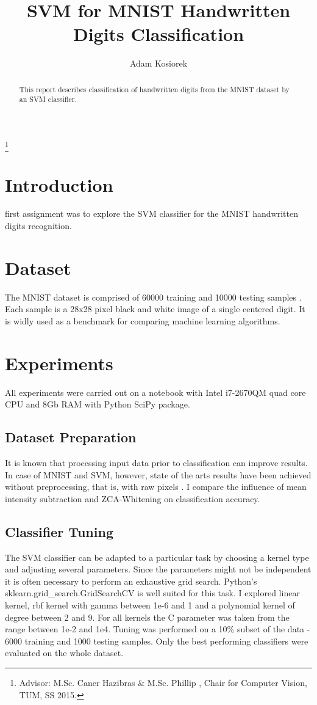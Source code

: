\documentclass[journal, a4paper]{IEEEtran}
\begin{document}
	\title{SVM for MNIST Handwritten Digits Classification}
	\author{Adam Kosiorek}
	\thanks{Advisor: M.Sc. Caner Hazibras & M.Sc. Phillip , Chair for Computer Vision, TUM, SS 2015.}
	\maketitle


\begin{abstract}
  This report describes classification of handwritten digits from the MNIST dataset by an SVM classifier.
\end{abstract}

\section{Introduction}
     first assignment was to explore the SVM classifier for the MNIST handwritten digits recognition. 

\section{Dataset}
    The MNIST dataset is comprised of 60000 training and 10000 testing samples \cite{MNIST}. Each sample is a 28x28 pixel black and white image of a single centered digit. It is widly used as a benchmark for comparing machine learning algorithms.
	

\section{Experiments}
    All experiments were carried out on a notebook with Intel i7-2670QM quad core CPU and 8Gb RAM with Python SciPy package.
    \subsection{Dataset Preparation}
	It is known that processing input data prior to classification can improve results. In case of MNIST and SVM, however, state of the arts results have been achieved without preprocessing, that is, with raw pixels \cite{VSVM}. I compare the influence of mean intensity subtraction and ZCA-Whitening \cite{UFLDL} on classification accuracy.
  
    \subsection{Classifier Tuning}
	The SVM classifier can be adapted to a particular task by choosing a kernel type and adjusting several parameters. Since the parameters might not be independent it is often necessary to perform an exhaustive grid search. Python's sklearn.grid\_search.GridSearchCV is well suited for this task. I explored linear kernel, rbf kernel with gamma between 1e-6 and 1 and a polynomial kernel of degree between 2 and 9. For all kernels the C parameter was taken from the range between 1e-2 and 1e4. Tuning was performed on a 10\% subset of the data - 6000 training and 1000 testing samples. Only the best performing classifiers were evaluated on the whole dataset.
		
\end{document}

